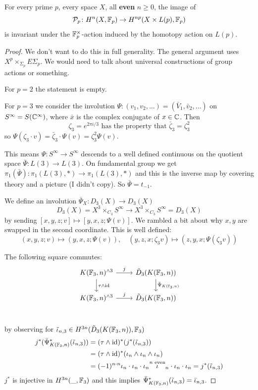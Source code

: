 \documentclass[language=english]{TemplateLecture}
\begin{document}
\begin{proposition}
    For every prime \(p\), every space \(X\), all \textbf{even} \(n\geq 0\), the image of
    \[\mathcal{P}_p\colon H^n(X,\mathbb{F}_p) \to H^{np}(X\times L(p), \mathbb{F}_p)\]
    is invariant under the \(\mathbb{F}_p^\times\)-action induced by the homotopy action on \(L(p)\).
\end{proposition}

\begin{proof}
    We don't want to do this in full generality. The general argument uses \(X^p\times_{\Sigma_p} E\Sigma_p\). We would need to talk about universal constructions of group actions or something.

    For \(p=2\) the statement is empty.

    For \(p = 3\) we consider the involution \(\Psi\colon (v_1, v_2,\dots) = (\bar V_1, \bar v_2,\dots)\) on \(S^\infty = S(\mathbb{C}^\infty)\), where \(\bar x\) is the complex conjugate of \(x\in \mathbb{C}\). Then
    \[\zeta_3 = e^{2\pi i/3} \text{ has the property that } \bar\zeta_3 = \zeta_3^2\]
    so \(\Psi(\zeta_3 \cdot v) = \bar \zeta_3 \cdot \Psi(v) = \zeta_3^2 \Psi(v)\).

    This means \(\Psi\colon S^\infty \to S^\infty\) descends to a well defined continuous on the quotient space \(\bar\Psi\colon L(3)\to L(3)\). On fundamental group we get \(\pi_1(\bar\Psi)\colon \pi_1(L(3),*)\to \pi_1(L(3), *)\) and this is the inverse map by covering theory and a picture (I didn't copy). So \(\bar\Psi = t_{-1}\).

    We define an involution \(\bar\Psi_X\colon D_3(X)\to D_3(X)\)
    \[D_3(X) = X^3\times_{C_3} S^\infty\to X^3\times_{C_3}S^\infty = D_3(X)\]
    by sending \([x,y,z;v]\mapsto [y,x,z;\Psi(v)]\).
    We rambled a bit about why \(x,y\) are swapped in the second coordinate. This is well defined:
    \[(x,y,z;v) \mapsto (y,x,z; \Psi(v)), \quad (y,z,x; \zeta_3 v) \mapsto (z,y,x;\Psi(\zeta_3 v))\]

    The following square commutes:
    \[\begin{tikzcd}
        K(\IF_3, n)^{\wedge 3} \ar[r, "j"] \ar[d, "\tau\wedge \id"] & \tilde D_3(K(\IF_3, n)) \ar[d, "\bar\Psi_{K(\IF_3,n)}"] \\
        K(\IF_3, n)^{\wedge 3} \ar[r, "j"] & \tilde D_3(K(\IF_3,n)) \\
    \end{tikzcd}\]


    by observing for \(\tilde\iota_{n,3}\in H^{3n}(\tilde D_3(K(\mathbb{F}_3,n)), \mathbb{F}_3)\)
    \[\begin{split}
        j^*(\bar\Psi_{K(\mathbb{F}_3,n)}^*(\tilde\iota_{n,3})) &= (\tau\wedge \operatorname{id})^*(j^*(\tilde \iota_{n,3})) \\
        &= (\tau\wedge \operatorname{id})^*(\iota_n\wedge \iota_n\wedge \iota_n) \\
        &= (-1)^{n\cdot n} \iota_n\cdot\iota_n \cdot\iota_n \overset{n\text{ even}} \iota_n\cdot\iota_n\cdot\iota_n = j^*(\tilde\iota_{n,3}) \\
    \end{split}\]
    \(j^*\) is injective in \(H^{3n}(\_, \mathbb{F}_3)\) and this implies \(\bar\Psi_{K(\mathbb{F}_3,n)} ^*(\tilde \iota_{n,3}) = \bar\iota_{n,3}\).


\end{proof}
\end{document}
